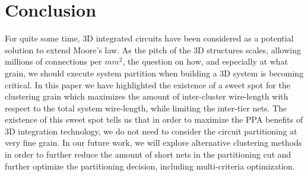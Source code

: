 \documentclass[conference]{IEEEtran}
\begin{document}
\section{Conclusion}\label{sec:concl}
For quite some time, 3D integrated circuits have been considered as a potential solution to extend Moore's law.
As the pitch of the 3D structures scales, allowing millions of connections per $mm^2$, the question on how, and especially at what grain, we should execute system partition when building a 3D system is becoming critical.
In this paper we have highlighted the existence of a sweet spot for the clustering grain which maximizes the amount of inter-cluster wire-length with respect to the total system wire-length, while limiting the inter-tier nets.
The existence of this sweet spot tells us that in order to maximize the PPA benefits of 3D integration technology, we do not need to consider the circuit partitioning at very fine grain.
In our future work, we will explore alternative clustering methods in order to further reduce the amount of short nets in the partitioning cut and further optimize the partitioning decision, including multi-criteria optimization.






%


\end{document}
